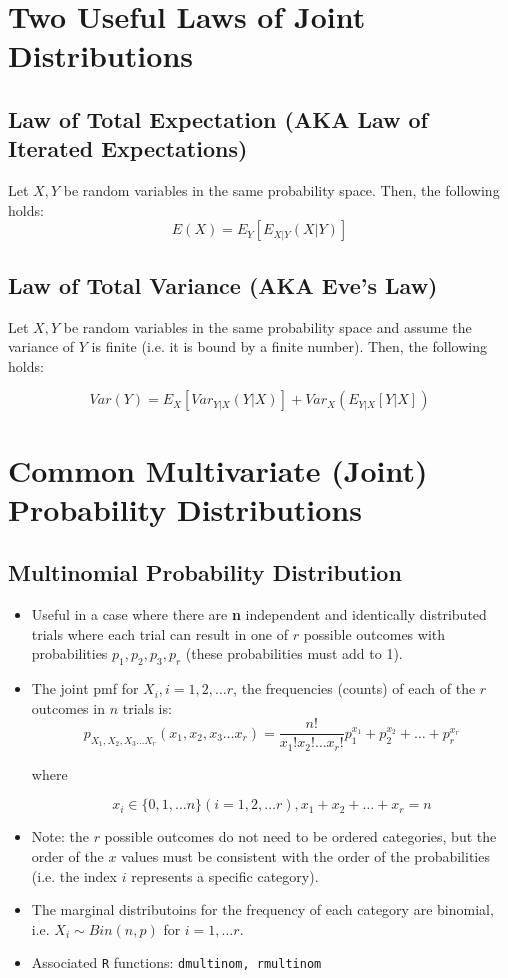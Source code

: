 \documentclass[12pt]{article}
\begin{document}
\section{Two Useful Laws of Joint Distributions}

\subsection{Law of Total Expectation (AKA Law of Iterated Expectations)}

Let $X, Y$ be random variables in the same probability space. Then, the following holds:
\[
	E(X) = E_Y[E_{X|Y}(X | Y)]
\]

\subsection{Law of Total Variance (AKA Eve's Law)}
Let $X, Y$ be random variables in the same probability space and assume the
variance of $Y$ is finite (i.e. it is bound by a finite number). Then, the
following holds:

\[
	Var(Y) = E_X[Var_{Y|X}(Y | X)] + Var_X(E_{Y | X}[Y | X])
\]

\section{Common Multivariate (Joint) Probability Distributions}

\subsection{Multinomial Probability Distribution}

\begin{itemize}
	\item Useful in a case where there are \textbf{n} independent and
	      identically distributed trials where each trial can result in one of
	      $r$ possible outcomes with probabilities $p_1, p_2, p_3, p_r$ (these
	      probabilities must add to 1).
	\item The joint pmf for $X_i, i = 1, 2, \ldots r$, the frequencies (counts)
	      of each of the $r$ outcomes in $n$ trials is:
	      \[
		      p_{X_1, X_2, X_3 \ldots X_r} (x_1, x_2, x_3 \ldots x_r) = \frac{n!}{x_1! x_2! \ldots x_r!} p_1^{x_1} + p_2^{x_2} + \ldots + p_r^{x_r}
	      \]

	      where

	      \[
		      x_i \in \{0, 1, \ldots n\}(i = 1, 2, \ldots r), x_1 + x_2 + \ldots + x_r = n
	      \]
	\item Note: the $r$ possible outcomes do not need to be ordered categories, but
	      the order of the $x$ values must be consistent with the order of
	      the probabilities (i.e. the index $i$ represents a specific
	      category).
	\item The marginal distributoins for the frequency of each category
	      are binomial, i.e. $X_i \sim Bin(n, p)$ for $i = 1, \ldots r$.
	\item Associated \verb|R| functions: \verb|dmultinom, rmultinom|
\end{itemize}
\end{document}
